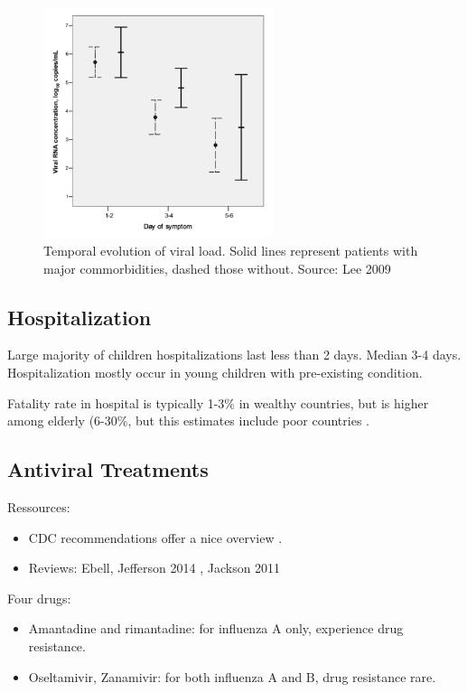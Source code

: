 \documentclass[11pt, onecolumn]{article}
\begin{document}
\begin{figure}[!ht]
\centering
    \includegraphics[angle=0,width=0.6\textwidth]{figures/VL_Lee.png}
\caption{Temporal evolution of viral load. Solid lines represent patients with major commorbidities, dashed those without. Source: Lee 2009 \cite{Lee:2009dc}}
\label{fig:VL_Lee}
\end{figure}


\subsection{Hospitalization}

Large majority of children hospitalizations last less than 2 days. Median 3-4 days. Hospitalization mostly occur in young children with pre-existing condition.

Fatality rate in hospital is typically 1-3\% in wealthy countries, but is higher among elderly (6-30\%, but this estimates include poor countries \cite{Wong:2015bb}.



\subsection{Antiviral Treatments}
\label{sec:antiviral}
Ressources:
\begin{itemize}
\item  CDC recommendations offer a nice overview \cite{CDC:2011wq}.
\item Reviews: Ebell\cite{Ebell:2014ic},  Jefferson 2014 \cite{Jefferson:2014ei}, Jackson 2011 \cite{Jackson:2011ff}
\end{itemize}

Four drugs: 
\begin{itemize}
\item Amantadine and rimantadine: for influenza A only, experience drug resistance.
\item Oseltamivir, Zanamivir: for both influenza A and B, drug resistance rare.
\end{itemize}
\end{document}
